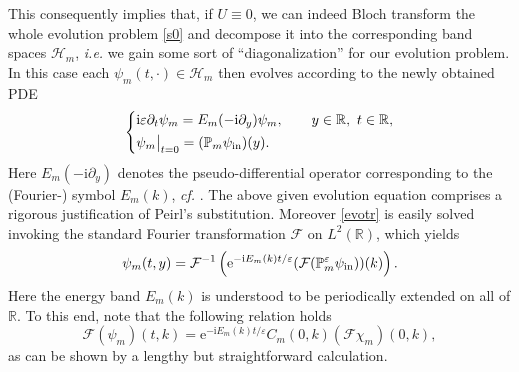 \documentclass[leqno,final]{siamltex}
\numberwithin{equation}{section}
\newcounter{me}
\begin{document}
This consequently implies that, if $U\equiv 0$, we can indeed
Bloch transform the whole evolution problem \eqref{s0} and
decompose it into the corresponding band spaces $\mathcal H_m$,
{{\sl i.e.\/ }} we gain some sort of ``diagonalization'' for our evolution
problem. In this case each $\psi_m(t,\cdot)\in \mathcal H_m$ then
evolves according to the newly obtained PDE
\begin{equation}\label{evotr}
\left \{
\begin{aligned}
& {\mathrm{i}} {{\varepsilon }} \partial_t \psi_m = E_m(-{\mathrm{i}} \partial_y) \psi_m , \qquad
y \in {{\mathbb R}}, \ t\in {{\mathbb R}},\\
& \psi_m\big |_{t=0}= (\mathbb P_m \psi_{\rm in})(y).
\end{aligned}
\right.
\end{equation}
Here $E_m(-{\mathrm{i}} \partial_y)$ denotes the pseudo-differential
operator corresponding to the (Fourier-) symbol $E_m(k)$, {{\sl cf.\/ }}
\cite{GMMP, PST, Te}. The above given evolution equation comprises
a rigorous justification of Peirl's substitution. Moreover
\eqref{evotr} is easily solved invoking the standard Fourier
transformation $\mathcal F$ on $L^2({{\mathbb R}})$, which yields \begin{equation}
\label{blsol} \psi_m (t,y) = \mathcal F^{-1}\left({\mathrm{e}}^{- {\mathrm{i}} E_m(k)
t /{{\varepsilon }}} (\mathcal F (\mathbb P^{{\varepsilon }}_m \psi_{\rm in}))(k)\right). \end{equation}
Here the energy band $E_m(k)$ is understood to be periodically
extended on all of ${{\mathbb R}}$. To this end, note that the following
relation holds \begin{equation} \label{Fcoeff} \mathcal F (\psi_{m})(t,k) =
{\mathrm{e}}^{- {\mathrm{i}} E_m(k) t /{{\varepsilon }}}C_m(0,k) (\mathcal F\chi_m)(0,k), \end{equation} as
can be shown by a lengthy but straightforward calculation.
\end{document}
